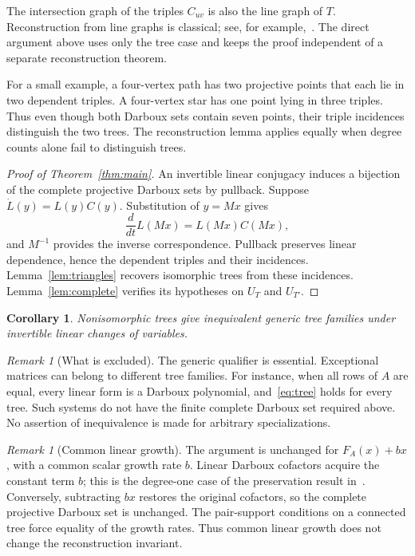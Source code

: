 \documentclass{amsart}
\newtheorem{corollary}[theorem]{Corollary}
\theoremstyle{remark}
\newtheorem{remark}[theorem]{Remark}
\numberwithin{equation}{section}
\begin{document}
The intersection graph of the triples $C_{uv}$ is also the line graph of $T$. Reconstruction from line graphs is classical; see, for example,~\cite[Theorem~1.1]{cuypers}. The direct argument above uses only the tree case and keeps the proof independent of a separate reconstruction theorem.

For a small example, a four-vertex path has two projective points that each lie in two dependent triples. A four-vertex star has one point lying in three triples. Thus even though both Darboux sets contain seven points, their triple incidences distinguish the two trees. The reconstruction lemma applies equally when degree counts alone fail to distinguish trees.

\begin{proof}[Proof of Theorem~\ref{thm:main}]
An invertible linear conjugacy induces a bijection of the complete projective Darboux sets by pullback. Suppose $\dot L(y)=L(y)C(y)$. Substitution of $y=Mx$ gives
\[
 \frac{d}{dt}L(Mx)=L(Mx)C(Mx),
\]
and $M^{-1}$ provides the inverse correspondence. Pullback preserves linear dependence, hence the dependent triples and their incidences. Lemma~\ref{lem:triangles} recovers isomorphic trees from these incidences. Lemma~\ref{lem:complete} verifies its hypotheses on $U_T$ and $U_{T'}$.
\end{proof}

\begin{corollary}
Nonisomorphic trees give inequivalent generic tree families under invertible linear changes of variables.
\end{corollary}

\begin{remark}[What is excluded]
The generic qualifier is essential. Exceptional matrices can belong to different tree families. For instance, when all rows of $A$ are equal, every linear form is a Darboux polynomial, and~\eqref{eq:tree} holds for every tree. Such systems do not have the finite complete Darboux set required above. No assertion of inequivalence is made for arbitrary specializations.
\end{remark}

\begin{remark}[Common linear growth]
The argument is unchanged for $F_A(x)+b x$, with a common scalar growth rate $b$. Linear Darboux cofactors acquire the constant term $b$; this is the degree-one case of the preservation result in~\cite[Theorem~1]{homogeneous}. Conversely, subtracting $b x$ restores the original cofactors, so the complete projective Darboux set is unchanged. The pair-support conditions on a connected tree force equality of the growth rates. Thus common linear growth does not change the reconstruction invariant.
\end{remark}
\end{document}
